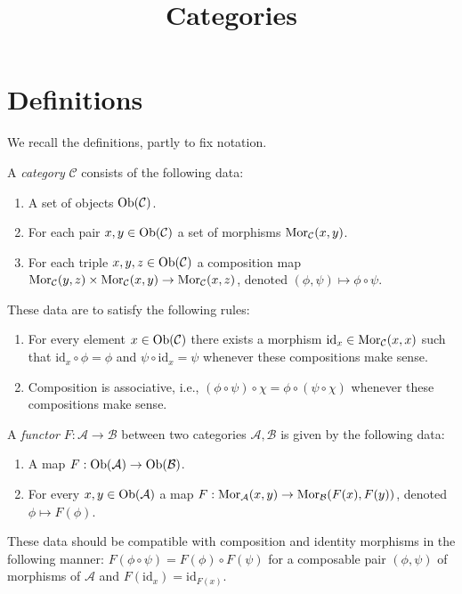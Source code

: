 



\title{Categories}
\maketitle

\label{section-phantom}

\tableofcontents

\section{Definitions}
\label{section-definition-categories}

\noindent
We recall the definitions, partly to fix
notation.

\begin{definition}
\label{definition-category}
A {\it category} $\mathcal{C}$ consists of
the following data:
\begin{enumerate}
\item A set of objects $\mathop{\mathrm{Ob}}\nolimits(\mathcal{C})$.
\item For each pair $x, y \in
\mathop{\mathrm{Ob}}\nolimits(\mathcal{C})$ a set of morphisms
$\mathop{\mathrm{Mor}}\nolimits_\mathcal{C}(x, y)$.
\item For each triple $x, y, z\in
\mathop{\mathrm{Ob}}\nolimits(\mathcal{C})$ a composition
map $ \mathop{\mathrm{Mor}}\nolimits_\mathcal{C}(y, z) \times
\mathop{\mathrm{Mor}}\nolimits_\mathcal{C}(x, y)
\to \mathop{\mathrm{Mor}}\nolimits_\mathcal{C}(x, z) $, denoted $(\phi,
\psi) \mapsto
\phi \circ \psi$.
\end{enumerate}
These data are to satisfy the following
rules:
\begin{enumerate}
\item For every element $x\in
\mathop{\mathrm{Ob}}\nolimits(\mathcal{C})$ there exists a
morphism $\text{id}_x\in \mathop{\mathrm{Mor}}\nolimits_\mathcal{C}(x,
x)$ such that
$\text{id}_x \circ \phi = \phi$ and $\psi
\circ \text{id}_x = \psi $ whenever
these compositions make sense.
\item Composition is associative, i.e.,
$(\phi \circ \psi) \circ \chi =
\phi \circ ( \psi \circ \chi)$ whenever these
compositions make sense.
\end{enumerate}
\end{definition}

\begin{definition}
\label{definition-functor}
A {\it functor} $F : \mathcal{A} \to
\mathcal{B}$
between two categories $\mathcal{A},
\mathcal{B}$ is given by the
following data:
\begin{enumerate}
\item A map $F : \mathop{\mathrm{Ob}}\nolimits(\mathcal{A}) \to
\mathop{\mathrm{Ob}}\nolimits(\mathcal{B})$.
\item For every $x, y \in \mathop{\mathrm{Ob}}\nolimits(\mathcal{A})$ a
map
$F : \mathop{\mathrm{Mor}}\nolimits_\mathcal{A}(x, y) \to
\mathop{\mathrm{Mor}}\nolimits_\mathcal{B}(F(x), F(y))$,
denoted $\phi \mapsto F(\phi)$.
\end{enumerate}
These data should be compatible with
composition and identity morphisms
in the following manner: $F(\phi \circ \psi)
=
F(\phi) \circ F(\psi)$ for a composable pair
$(\phi, \psi)$ of
morphisms of $\mathcal{A}$ and
$F(\text{id}_x) = \text{id}_{F(x)}$.
\end{definition}

